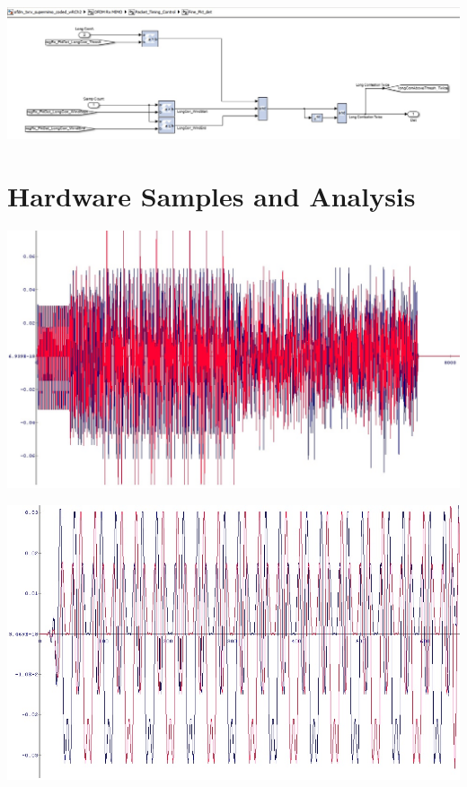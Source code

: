 \begin{center}
\includegraphics[width=\textwidth]{content/fig/fine_packetDetect.JPG}
\label{autocorrblock}
\end{center}

\section{Hardware Samples and Analysis}
\label{hw_samples}

\begin{center}
\includegraphics[width=\textwidth]{content/fig/ofdmframe_chipscope.JPG}
\label{ofdmframe_chipscope}
\end{center}

\begin{center}
\includegraphics[width=\textwidth]{content/fig/sts_chipscope.JPG}
\label{sts_chipscope}
\end{center}

